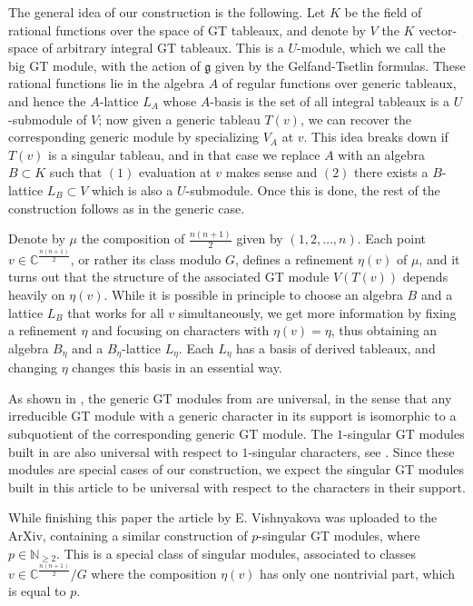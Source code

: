 \documentclass[11pt,fleqn]{article}
\newcommand\NN{\mathbb N}
\newcommand\CC{\mathbb C}
\newcommand\g{\mathfrak g}
\newcommand\bigmodule{big GT module}
\begin{document}
The general idea of our construction is the following. Let $K$ be the field of 
rational functions over the space of GT tableaux, and denote by $V$ the $K$ 
vector-space of arbitrary integral GT tableaux. This is a $U$-module, which we
call the \bigmodule, with the action of $\g$ given by the Gelfand-Tsetlin 
formulas. These rational functions lie in the algebra $A$ of regular functions 
over generic tableaux, and hence the $A$-lattice $L_A$ whose $A$-basis is the 
set of all integral tableaux is a $U$-submodule of $V$; now given a generic 
tableau $T(v)$, we can recover the corresponding generic module by 
specializing $V_A$ at $v$. This idea breaks down if $T(v)$ is a singular 
tableau, and in that case we replace $A$ with an algebra $B \subset K$ such 
that $(1)$ evaluation at $v$ makes sense and $(2)$ there exists a $B$-lattice 
$L_B \subset V$ which is also a $U$-submodule. Once this is done, the rest of 
the construction follows as in the generic case.

Denote by $\mu$ the composition of $\frac{n(n+1)}{2}$ given by 
$(1,2,\ldots, n)$. Each point $v \in \CC^{\frac{n(n+1)}{2}}$, or rather its 
class modulo $G$, defines a refinement $\eta(v)$ of $\mu$, and it turns out 
that the structure of the associated GT module $V(T(v))$ depends heavily on 
$\eta(v)$. While it is possible in principle to choose an algebra $B$ and a 
lattice $L_B$ that works for all $v$ simultaneously, we get more information 
by fixing a refinement $\eta$ and focusing on characters with $\eta(v) = 
\eta$, thus obtaining an algebra $B_\eta$ and a $B_\eta$-lattice $L_\eta$. 
Each $L_\eta$ has a basis of derived tableaux, and changing $\eta$ changes 
this basis in an essential way.

As shown in \cite{FGR-generic-irreducible}, the generic GT modules from 
\cite{DFO-GT-modules} are universal, in the sense that any irreducible GT 
module with a generic character in its support is isomorphic to a subquotient
of the corresponding generic GT module. The $1$-singular GT modules built in 
\cite{FGR-1-singular} are also universal with respect to $1$-singular 
characters, see \cite{FGR-drinfeld}. Since these modules are special cases of
our construction, we expect the singular GT modules built in this article to
be universal with respect to the characters in their support.

While finishing this paper the article \cite{V-geometric-singular-GT} by 
E. Vishnyakova was uploaded to the ArXiv, containing a similar construction
of $p$-singular GT modules, where $p \in \NN_{\geq 2}$. This is a special 
class of singular modules, associated to classes $v \in 
\CC^{\frac{n(n+1)}{2}}/G$ where the composition $\eta(v)$ has only one 
nontrivial part, which is equal to $p$.
\end{document}
